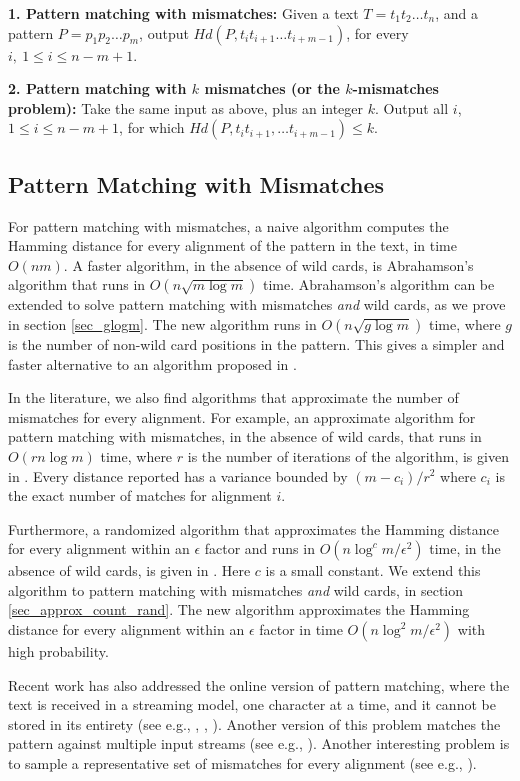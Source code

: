 {\bf 1. Pattern matching with mismatches:} Given a text $T=t_1t_2\ldots
t_n$, and a pattern $P=p_1p_2\ldots p_m$, output $Hd(P, t_i t_{i+1}\ldots
t_{i+m-1})$, for every $i,~1\leq i\leq n-m+1$.

{\bf 2. Pattern matching with $k$ mismatches (or the $k$-mismatches problem):}
Take the same input as above, plus an integer $k$. Output all $i$, $1\leq i\leq
n-m+1$, for which $Hd(P, t_i t_{i+1},\ldots t_{i+m-1}) \leq k$.


\subsection{Pattern Matching with Mismatches}

For pattern matching with mismatches, a naive algorithm
computes the Hamming distance for every alignment of the pattern in the
text, in time $O(nm)$. A faster algorithm, in the absence of wild cards, is
Abrahamson's algorithm \cite{ABR87} that runs in $O(n \sqrt{m \log m})$
time.
Abrahamson's algorithm can be extended to solve pattern matching
with mismatches {\em and} wild cards, as we prove in section \ref{sec_glogm}.
The new algorithm runs in $O(n \sqrt{g \log m})$ time, where $g$ is the number of non-wild card positions in the pattern. This gives a simpler and
faster alternative to an algorithm proposed in \cite{ALP04}.

In the literature, we also find algorithms that approximate the number of
mismatches for every alignment. For example, an approximate algorithm for
pattern matching with mismatches, in the absence of wild cards, that runs in $O(r n \log
m)$ time, where $r$ is the number of iterations of the algorithm, is
given in \cite{ACD01}. Every distance reported has a variance bounded by
$(m-c_i)/{r^2}$ where $c_i$ is the exact number of matches for alignment $i$.

Furthermore, a randomized algorithm that approximates the Hamming distance
for every alignment within an $\epsilon$ factor and runs in $O(n
\log^cm/\epsilon^2)$ time, in the absence of wild cards, is given in \cite{KAR93}.
Here $c$ is a small constant. We extend this algorithm to
pattern matching with mismatches {\em and} wild cards, in
section \ref{sec_approx_count_rand}.
The new algorithm
approximates the Hamming distance for every alignment within an $\epsilon$ factor in time
$O(n\log^2m/\epsilon^2)$ with high probability.

Recent work has also addressed the online
version of pattern matching, where the text is received in a
streaming model, one character at a time, and it cannot be stored in its
entirety (see e.g., \cite{CKP08}, \cite{PP09}, \cite{PL07}).
Another version of this problem matches the pattern against multiple input
streams (see e.g., \cite{CEP+07}). Another interesting problem is to sample a
representative set of mismatches for every alignment (see e.g., \cite{CEP+12}).

